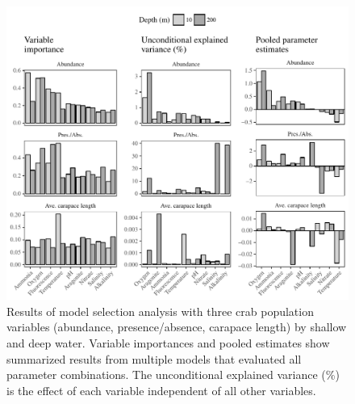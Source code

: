 \documentclass[letterpaper,12pt]{article}\usepackage[]{graphicx}\usepackage[]{color}
\makeatletter
\def\maxwidth{ %
  \ifdim\Gin@nat@width>\linewidth
    \linewidth
  \else
    \Gin@nat@width
  \fi
}
\newenvironment{knitrout}{}{} %
\makeatother
\begin{document}
\begin{knitrout}
\color{fgcolor}\begin{figure}
\includegraphics[width=\maxwidth]{figure/unnamed-chunk-5-1} \caption[Results of model selection analysis with three crab population variables (abundance, presence/absence, carapace length) by shallow and deep water]{Results of model selection analysis with three crab population variables (abundance, presence/absence, carapace length) by shallow and deep water. Variable importances and pooled estimates show summarized results from multiple models that evaluated all parameter combinations.  The unconditional explained variance (\%) is the effect of each variable independent of all other variables.}\label{fig:unnamed-chunk-5}
\end{figure}


\end{knitrout}
\clearpage
\end{document}
